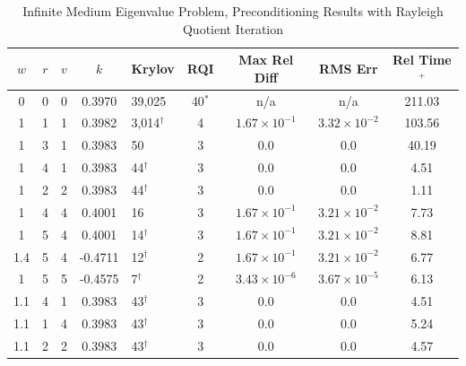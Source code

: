 \begin{table}[!h]
\caption{Infinite Medium Eigenvalue Problem, Preconditioning Results with Rayleigh Quotient Iteration}
\begin{center}
\begin{tabular}{| c | c | c | c | l | c | c | c | c |}
\hline
$w$ & $r$ & $v$ & $k$ & Krylov & RQI & Max Rel Diff & RMS Err & Rel Time$^{+}$ \\[0.5ex]
\hline
0    & 0 & 0 & 0.3970 & 39,025              & 40$^{*}$  & n/a & n/a & 211.03 \\%
1    & 1 & 1 & 0.3982 & 3,014$^{\dag}$ & 4 & $1.67 \times 10^{-1}$ & $3.32 \times 10^{-2}$ & 103.56 \\%
1    & 3 & 1 & 0.3983 & 50                     & 3 & 0.0 & 0.0 & 40.19 \\ %
1    & 4 & 1 & 0.3983 & 44$^{\dag}$      & 3 & 0.0 & 0.0 & 4.51 \\ %
1    & 2 & 2 & 0.3983 & 44$^{\dag}$      & 3 & 0.0 & 0.0 & 1.11 \\ %
1    & 4 & 4 & 0.4001 & 16                     & 3 & $1.67 \times 10^{-1}$ & $3.21 \times 10^{-2}$ & 7.73 \\ %
1    & 5 & 4 & 0.4001 & 14$^{\dag}$     & 3 & $1.67 \times 10^{-1}$ & $3.21 \times 10^{-2}$ & 8.81 \\ %
1.4 & 5 & 4 & -0.4711 & 12$^{\dag}$    & 2 & $1.67 \times 10^{-1}$ & $3.21 \times 10^{-2}$ & 6.77 \\ %
1    & 5 & 5 & -0.4575 & 7$^{\dag}$      & 2 & $3.43 \times 10^{-6}$ & $3.67 \times 10^{-5}$ & 6.13 \\ %
\hline
1.1 & 4 & 1 & 0.3983 & 43$^{\dag}$      & 3 & 0.0 & 0.0 & 4.51 \\ %
1.1 & 1 & 4 & 0.3983 & 43$^{\dag}$      & 3 & 0.0 & 0.0 & 5.24 \\ %
1.1 & 2 & 2 & 0.3983 & 43$^{\dag}$      & 3 & 0.0 & 0.0 & 4.57 \\ %

\end{tabular}
\end{center}
\end{table}
